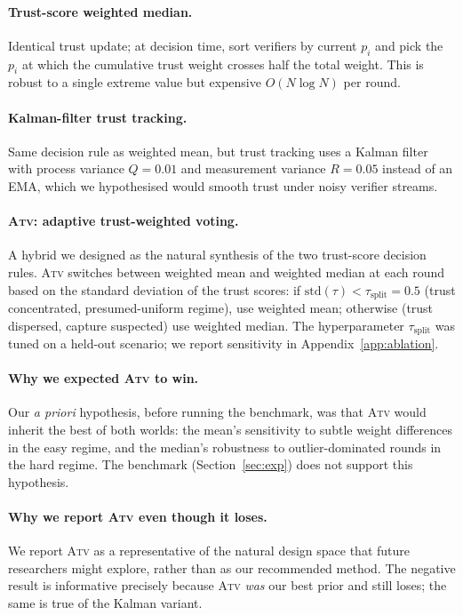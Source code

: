 \documentclass[11pt]{article}
\begin{document}
\paragraph{Trust-score weighted median.}
\label{sub:trustmedian}
Identical trust update; at decision time, sort verifiers by current
$p_i$ and pick the $p_i$ at which the cumulative trust weight crosses
half the total weight. This is robust to a single extreme value but
expensive $O(N \log N)$ per round.

\paragraph{Kalman-filter trust tracking.}
\label{sub:kalman}
Same decision rule as weighted mean, but trust tracking uses a
Kalman filter with process variance $Q = 0.01$ and measurement
variance $R = 0.05$ instead of an EMA, which we hypothesised would
smooth trust under noisy verifier streams.

\paragraph{\textsc{Atv}: adaptive trust-weighted voting.}
\label{sub:atv}
A hybrid we designed as the natural synthesis of the two trust-score
decision rules. \textsc{Atv} switches between weighted mean and
weighted median at each round based on the standard deviation of the
trust scores: if $\text{std}(\tau) < \tau_{\text{split}} = 0.5$ (trust
concentrated, presumed-uniform regime), use weighted mean; otherwise
(trust dispersed, capture suspected) use weighted median. The
hyperparameter $\tau_{\text{split}}$ was tuned on a held-out scenario;
we report sensitivity in Appendix~\ref{app:ablation}.

\paragraph{Why we expected \textsc{Atv} to win.}
Our \emph{a priori} hypothesis, before running the benchmark, was that
\textsc{Atv} would inherit the best of both worlds: the mean's
sensitivity to subtle weight differences in the easy regime, and the
median's robustness to outlier-dominated rounds in the hard regime.
The benchmark (Section~\ref{sec:exp}) does not support this hypothesis.

\paragraph{Why we report \textsc{Atv} even though it loses.}
We report \textsc{Atv} as a representative of the natural design space
that future researchers might explore, rather than as our recommended
method. The negative result is informative precisely because \textsc{Atv}
\emph{was} our best prior and still loses; the same is true of the
Kalman variant.
\end{document}
